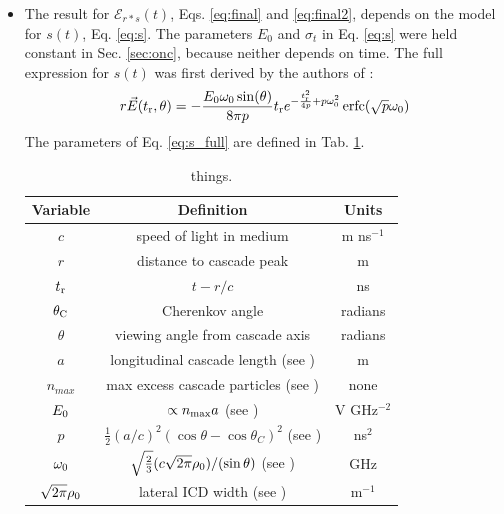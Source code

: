 \documentclass[amsmath,amssymb,aps,prd,10pt,twocolumn,showkeys]{revtex4}
\DeclareMathOperator\erfc{erfc}
\begin{document}
\begin{itemize}
\item The result for $\mathcal{E}_{r*s}(t)$, Eqs. \ref{eq:final} and \ref{eq:final2}, depends on the model for $s(t)$, Eq. \ref{eq:s}.  The parameters $E_0$ and $\sigma_t$ in Eq. \ref{eq:s} were held constant in Sec. \ref{sec:onc}, because neither depends on time.  The full expression for $s(t)$ was first derived by the authors of \cite{PhysRevD.105.123019}:
\begin{equation}
r\vec{E}(t_{\rm r},\theta) = -\frac{E_0\omega_0 \sin(\theta)}{8\pi p}t_{\rm r}e^{-\frac{t_{\rm r}^2}{4p}+p\omega_0^2}\erfc(\sqrt{p}\omega_0) \label{eq:s_full}
\end{equation}
The parameters of Eq. \ref{eq:s_full} are defined in Tab. \ref{tab:param}.
\begin{table}
\small
\begin{tabular}{| c | c | c |} \hline
\textbf{Variable} & \textbf{Definition} & \textbf{Units}\\ \hline
$c$ & speed of light in medium & m ns$^{-1}$ \\ 
$r$ & distance to cascade peak & m \\
$t_{\rm r}$ & $t-r/c$ & ns \\
$\theta_{\rm C}$ & Cherenkov angle & radians \\ 
$\theta$ & viewing angle from cascade axis & radians \\ 
$a$ & longitudinal cascade length (see \cite{10.1103/physrevd.65.016003}) & m \\ 
$n_{max}$ & max excess cascade particles (see \cite{10.1103/physrevd.65.016003})  & none \\
$E_{\rm 0}$ & $\propto n_{\rm max}a$ (see \cite{10.1103/physrevd.65.016003}) & V GHz$^{-2}$ \\
$p$ & $\frac{1}{2}(a/c)^2 \left(\cos\theta - \cos\theta_C\right)^2$ (see \cite{PhysRevD.105.123019}) & ns$^2$ \\ 
$\omega_{\rm 0}$ & $\sqrt{\frac{2}{3}} (c\sqrt{2\pi}\rho_{\rm 0})/(\sin\theta)$ (see \cite{10.1016/j.astropartphys.2017.03.008}) & GHz \\
$\sqrt{2\pi}\rho_{\rm 0}$ & lateral ICD width (see \cite{10.1016/j.astropartphys.2017.03.008}) & m$^{-1}$ \\ \hline
\end{tabular}
\caption{\label{tab:param} things.}
\end{table}

\end{itemize}
\end{document}
